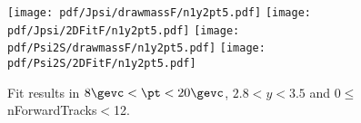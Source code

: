 \begin{figure}[H]
\begin{center}
\texttt{[image: pdf/Jpsi/drawmassF/n1y2pt5.pdf]}
\texttt{[image: pdf/Jpsi/2DFitF/n1y2pt5.pdf]}
\vspace*{-0.5cm}
\texttt{[image: pdf/Psi2S/drawmassF/n1y2pt5.pdf]}
\texttt{[image: pdf/Psi2S/2DFitF/n1y2pt5.pdf]}
\vspace*{-0.5cm}
\end{center}
\caption{Fit results in $8\gevc<\pt<20\gevc$, $2.8<y<3.5$ and 0$\leq$nForwardTracks$<$12.}
\label{Fitn1y2pt5}
\end{figure}
